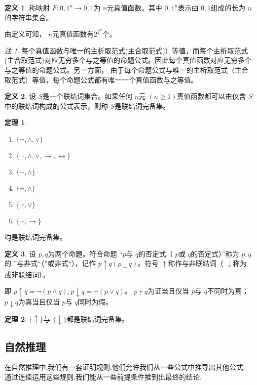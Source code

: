 \documentclass[a4paper,11pt]{article}%
\theoremstyle{remark}
\newtheorem*{remark}{注}
\theoremstyle{remark}
\theoremstyle{definition}
\newtheorem{theorem}{定理}[section]
\theoremstyle{definition}
\newtheorem*{definition}{定义}
\theoremstyle{plain}
\begin{document}
\begin{definition}
    称映射 $F:{0,1}^n\rightarrow {0,1}$为 $n$元真值函数。其中 ${0,1}^n$表示由 $0,1$组成的长为 $n$的字符串集合。
\end{definition}
由定义可知， $n$元真值函数有$2^{2^n}$个。
\begin{remark}
    每个真值函数与唯一的主析取范式(主合取范式)）等值，而每个主析取范式(主合取范式)对应无穷多个与之等值的命题公式。因此每个真值函数对应无穷多个与之等值的命题公式。另一方面，
    由于每个命题公式与唯一的主析取范式（主合取范式）等值，每个命题公式都有唯一一个真值函数与之等值。
\end{remark}
\begin{definition}
    设 $S$是一个联结词集合。如果任何 $n$元 $(n\geq 1)$真值函数都可以由仅含 $S$中的联结词构成的公式表示，则称 $S$是联结词完备集。
\end{definition}
\begin{theorem}
    \begin{enumerate}
        \item $\{\lnot,\land,\lor\}$
        \item $\{\lnot,\land,\lor,\rightarrow,\leftrightarrow\}$
        \item $\{\lnot,\land\}$
        \item $\{\lnot,\land\}$
        \item $\{\lnot,\lor\}$
        \item $\{\lnot,\rightarrow\}$
    \end{enumerate}
    均是联结词完备集。
\end{theorem}
\begin{definition}
    设 $p,q$为两个命题。符合命题 ``$p$与 $q$的否定式（ $p$或 $q$的否定式）''称为 $p,q$的
    ”与非式“（”或非式“），记作 $p\uparrow q(p\downarrow q)$。符号 $\uparrow$称作与非联结词（ $\downarrow$称为或非联结词）。
\end{definition}
即 $p\uparrow q = \lnot (p\land q),p\downarrow q = \lnot(p\lor q)$。 $p\uparrow q$为证当且仅当 $p$与 $q$不同时为真；
$p\downarrow q$为真当且仅当 $p$与 $q$同时为假。
\begin{theorem}
    $\{\uparrow\}$与 $\{\downarrow\}$都是联结词完备集。
\end{theorem}
\subsection{自然推理}
在自然推理中,我们有一套证明规则,他们允许我们从一些公式中推导出其他公式.
通过连续运用这些规则,我们能从一些前提条件推到出最终的结论.
\end{document}
